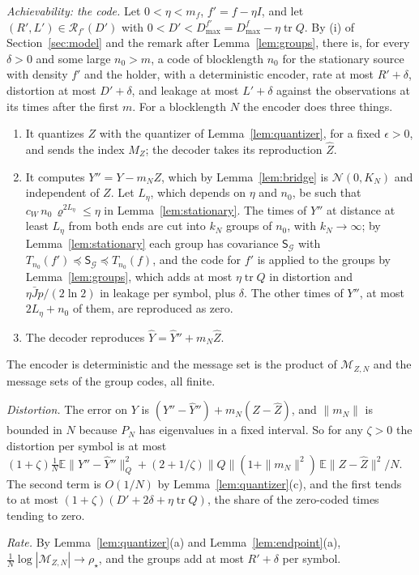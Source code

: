 \documentclass[11pt,onecolumn]{IEEEtran}
\newcommand{\E}{\mathbb{E}}
\newcommand{\tr}{\operatorname{tr}}
\begin{document}
\emph{Achievability: the code.} Let $0<\eta<m_f$, $f'=f-\eta I$, and let
$(R',L')\in\mathcal R_{f'}(D')$ with $0<D'<D_{\max}^{f'}=D_{\max}^f-\eta\tr Q$.
By (i) of Section~\ref{sec:model} and the remark after
Lemma~\ref{lem:groups}, there is, for every $\delta>0$ and some large
$n_0>m$, a code of blocklength $n_0$ for the stationary source with
density $f'$ and the holder, with a deterministic encoder, rate at most
$R'+\delta$, distortion at most $D'+\delta$, and leakage at most
$L'+\delta$ against the observations at its times after the first $m$.
For a blocklength $N$ the encoder does three things.
\begin{enumerate}
\item It quantizes $Z$ with the quantizer of Lemma~\ref{lem:quantizer},
for a fixed $\epsilon>0$, and sends the index $M_Z$; the decoder takes
its reproduction $\hat Z$.
\item It computes $Y''=Y-m_NZ$, which by Lemma~\ref{lem:bridge} is
$\mathcal N(0,K_N)$ and independent of $Z$. Let $L_\eta$, which depends
on $\eta$ and $n_0$, be such that
$c_W\,n_0\,\varrho^{2L_\eta}\le\eta$ in Lemma~\ref{lem:stationary}. The
times of $Y''$ at distance at least $L_\eta$ from both ends are cut into
$k_N$ groups of $n_0$, with $k_N\to\infty$; by Lemma~\ref{lem:stationary} each group has
covariance $\mathsf S_{\mathcal G}$ with
$T_{n_0}(f')\preceq\mathsf S_{\mathcal G}\preceq T_{n_0}(f)$, and the code
for $f'$ is applied to the groups by Lemma~\ref{lem:groups}, which adds
at most $\eta\tr Q$ in distortion and $\eta\bar Jp/(2\ln2)$ in leakage per
symbol, plus $\delta$. The other times of $Y''$, at most $2L_\eta+n_0$ of
them, are reproduced as zero.
\item The decoder reproduces $\hat Y=\hat Y''+m_N\hat Z$.
\end{enumerate}
The encoder is deterministic and the message set is the product of
$\mathcal M_{Z,N}$ and the message sets of the group codes, all finite.

\emph{Distortion.} The error on $Y$ is $(Y''-\hat Y'')+m_N(Z-\hat Z)$,
and $\|m_N\|$ is bounded in $N$ because $P_N$ has eigenvalues in a
fixed interval. So for any $\zeta>0$ the distortion per symbol is at
most
$(1+\zeta)\tfrac1N\E\|Y''-\hat Y''\|_Q^2+(2+1/\zeta)\|Q\|(1+\|m_N\|^2)\,\E\|Z-\hat Z\|^2/N$.
The second term is $O(1/N)$ by Lemma~\ref{lem:quantizer}(c), and the
first tends to at most $(1+\zeta)(D'+2\delta+\eta\tr Q)$, the share of
the zero-coded times tending to zero.

\emph{Rate.} By Lemma~\ref{lem:quantizer}(a) and
Lemma~\ref{lem:endpoint}(a), $\tfrac1N\log|\mathcal M_{Z,N}|\to\rho_\star$,
and the groups add at most $R'+\delta$ per symbol.
\end{document}
